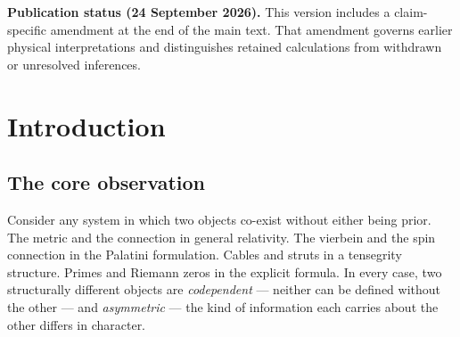 \documentclass[12pt,a4paper]{article}
\theoremstyle{plain}
\theoremstyle{definition}
\theoremstyle{remark}
\begin{document}
\begin{abstract}
Within the GL(4) fiber algebra, we show that
$\mathfrak{su}(3)\oplus\mathfrak{u}(1)_{B-L}$ embeds via the Pati--Salam
route while $\mathfrak{su}(2)_L$ arises from the $O(4)$ fiber after vacuum 
selection (Electroweak Containment).  New exact computations reveal that the
split real form $\mathfrak{sl}(3,\mathbb{R})$—the algebraic skeleton of
$\mathfrak{su}(3)$—embeds in the Palatini geometry, split $6+3$ across torsion
and Lorentz sectors.  This tightens the colour charge gap from an open problem
to a single remaining step: complexification via the torsion‑induced spinor
bundle, whose chiral zero-modes have already been demonstrated numerically.
A two-stage selection mechanism is established: algebraic closure uniquely selects
$\mathfrak{sl}(3,\mathbb{R})$ among 8-dimensional subspaces of $\mathfrak{sl}(4,\mathbb{R})$,
and a uniquely determined chirality map completes it to $\mathfrak{su}(3)$.
Applied to quantum gravity, the Ashtekar variable pair $(E,A)$ is identified
as a natural ACS with the three LQG constraints as its three coupling orders.
The Barbero--Immirzi parameter is derived from the ACS information balance
condition, yielding $\gamma = 0.274$ via the discrete spin-$j$ area spectrum,
matching the Meissner partition function result.
\end{abstract}
\par\smallskip\noindent\textbf{Publication status (24 September 2026).}
This version includes a claim-specific amendment at the end of the main text.
That amendment governs earlier physical interpretations and distinguishes
retained calculations from withdrawn or unresolved inferences.\par\smallskip


\tableofcontents
\newpage

\section{Introduction}
\label{sec:intro}

\subsection{The core observation}

Consider any system in which two objects co-exist without either being prior.
The metric and the connection in general relativity.
The vierbein and the spin connection in the Palatini formulation.
Cables and struts in a tensegrity structure.
Primes and Riemann zeros in the explicit formula.
In every case, two structurally different objects are \emph{codependent} ---
neither can be defined without the other --- and \emph{asymmetric} --- 
the kind of information each carries about the other differs in character.
\end{document}
